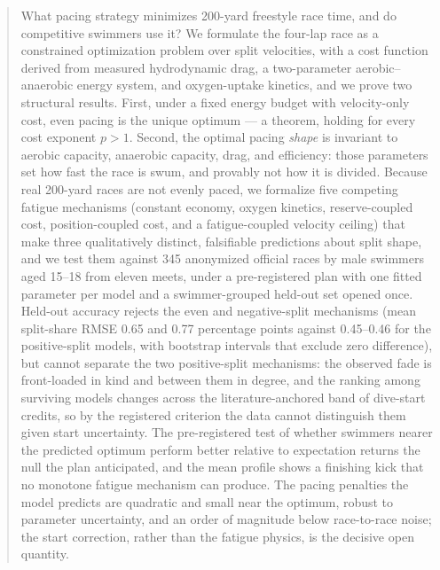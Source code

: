\begin{abstract}
What pacing strategy minimizes 200-yard freestyle race time, and do
competitive swimmers use it? We formulate the four-lap race as a constrained
optimization problem over split velocities, with a cost function derived from
measured hydrodynamic drag, a two-parameter aerobic--anaerobic energy system,
and oxygen-uptake kinetics, and we prove two structural results. First, under
a fixed energy budget with velocity-only cost, even pacing is the unique
optimum --- a theorem, holding for every cost exponent $p>1$. Second, the
optimal pacing \emph{shape} is invariant to aerobic capacity, anaerobic
capacity, drag, and efficiency: those parameters set how fast the race is
swum, and provably not how it is divided. Because real 200-yard races are not
evenly paced, we formalize five competing fatigue mechanisms (constant
economy, oxygen kinetics, reserve-coupled cost, position-coupled cost, and a
fatigue-coupled velocity ceiling) that make three qualitatively distinct,
falsifiable predictions about split shape, and we test them against 345
anonymized official races by male swimmers aged 15--18 from eleven meets,
under a pre-registered plan with one fitted parameter per model and a
swimmer-grouped held-out set opened once. Held-out accuracy rejects the
even and negative-split mechanisms (mean split-share RMSE 0.65 and 0.77
percentage points against 0.45--0.46 for the positive-split models, with
bootstrap intervals that exclude zero difference), but cannot separate the
two positive-split mechanisms: the observed fade is front-loaded in kind
and between them in degree, and the ranking among surviving models changes
across the literature-anchored band of dive-start credits, so by the
registered criterion the data cannot distinguish them given start
uncertainty. The pre-registered test of whether swimmers nearer the
predicted optimum perform better relative to expectation returns the null
the plan anticipated, and the mean profile shows a finishing kick that no
monotone fatigue mechanism can produce. The pacing penalties the model
predicts are quadratic and small near the optimum, robust to parameter
uncertainty, and an order of magnitude below race-to-race noise; the start
correction, rather than the fatigue physics, is the decisive open quantity.
\end{abstract}
